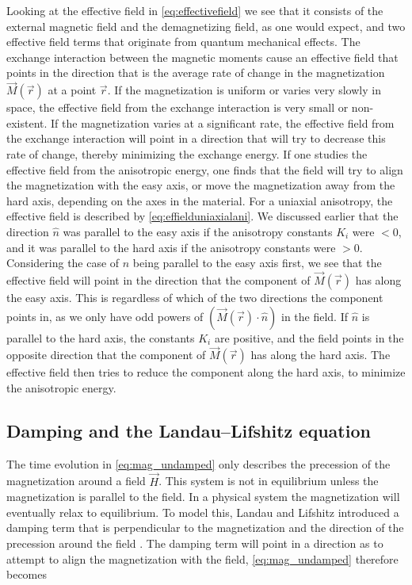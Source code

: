 \documentclass[1p]{elsarticle}		%
\numberwithin{equation}{section}
\begin{document}
Looking at the effective field in \eqref{eq:effectivefield} we see that it consists of the external magnetic field and the demagnetizing field, as one would expect, and two effective field terms that originate from quantum mechanical effects. The exchange interaction between the magnetic moments cause an effective field that points in the direction that is the average rate of change in the magnetization $\vec{M}(\vec{r})$ at a point $\vec{r}$. If the magnetization is uniform or varies very slowly in space, the effective field from the exchange interaction is very small or non-existent. If the magnetization varies at a significant rate, the effective field from the exchange interaction will point in a direction that will try to decrease this rate of change, thereby minimizing the exchange energy. If one studies the effective field from the anisotropic energy, one finds that the field will try to align the magnetization with the easy axis, or move the magnetization away from the hard axis, depending on the axes in the material. For a uniaxial anisotropy, the effective field is described by \eqref{eq:effielduniaxialani}. We discussed earlier that the direction $\hat{n}$ was parallel to the easy axis if the anisotropy constants $K_i$ were $<0$, and it was parallel to the hard axis if the anisotropy constants were $>0$. Considering the case of $\hat{n}$ being parallel to the easy axis first, we see that the effective field will point in the direction that the component of $\vec{M}(\vec{r})$ has along the easy axis. This is regardless of which of the two directions the component points in, as we only have odd powers of $(\vec{M}(\vec{r})\cdot\hat{n})$ in the field. If $\hat{n}$ is parallel to the hard axis, the constants $K_i$ are positive, and the field points in the opposite direction that the component of $\vec{M}(\vec{r})$ has along the hard axis. The effective field then tries to reduce the component along the hard axis, to minimize the anisotropic energy.

\subsection{Damping and the Landau--Lifshitz equation}
The time evolution in \eqref{eq:mag_undamped} only describes the precession of the magnetization around a field $\vec{H}$. This system is not in equilibrium unless the magnetization is parallel to the field. In a physical system the magnetization will eventually relax to equilibrium. To model this, Landau and Lifshitz introduced a damping term that is perpendicular to the magnetization and the direction of the precession around the field \cite{LandauLifshitz1935}. The damping term will point in a direction as to attempt to align the magnetization with the field, \eqref{eq:mag_undamped} therefore becomes
\end{document}
